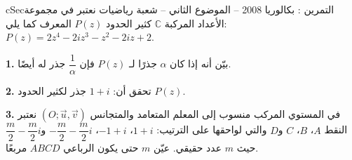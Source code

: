 \documentclass[12pt,a4paper]{article}
\newenvironment{BOX}[2]{\begin{otherlanguage}{english}\begin{arbox}{#1}{#2}}{\end{arbox}\end{otherlanguage}}
\newcounter{exo}
\newenvironment{tamrin}[1]{\stepcounter{exo}\begin{BOX}{cSec}{التمرين \theexo: #1}}{\end{BOX}}
\newcommand{\QQ}[1]{\par\smallskip\textbf{#1.} }
\begin{document}
\begin{tamrin}{بكالوريا 2008 -- الموضوع الثاني -- شعبة رياضيات}
نعتبر في مجموعة الأعداد المركبة $\mathbb C$ كثير الحدود $P(z)$ المعرف كما يلي: $P(z)=2z^4-2iz^3-z^2-2iz+2$.
\QQ{1} بيّن أنه إذا كان $\alpha$ جذرًا لـ $P(z)$ فإن $\dfrac1\alpha$ جذر له أيضًا.
\QQ{2} تحقق أن: $1+i$ جذر لكثير الحدود $P(z)$.
\QQ{3} في المستوي المركب منسوب إلى المعلم المتعامد والمتجانس $(O;\vec u,\vec v)$ نعتبر النقط $A$، $B$، $C$ و$D$ والتي لواحقها على الترتيب:
$1+i$، $-1+i$، $-\dfrac m2-\dfrac m2i$ و$\dfrac m2-\dfrac m2i$ حيث $m$ عدد حقيقي.
عيّن $m$ حتى يكون الرباعي $ABCD$ مربعًا.
\end{tamrin}
\end{document}
